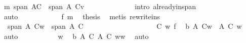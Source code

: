 \begin{isabellebody}
\ m{}{\isacharcolon}\ {\isachardoublequoteopen}span\ {\isacharparenleft}{\isacharquery}A{\isacharprime}{\isasymunion}C{\isacharprime}{\isacharparenright}\ {\isacharequal}\ span\ {\isacharparenleft}{\isacharparenleft}{\isacharquery}A{\isacharprime}{\isasymunion}\ C{\isacharprime}{\isacharparenright}{\isasymunion}{\isacharbraceleft}v{\isacharbraceright}{\isacharparenright}{\isachardoublequoteclose}\isanewline
\ \ \ \ \ \ \ \ \ \ \ \ \isamarkupfalse%
\ {\isacharparenleft}intro\ already{\isacharunderscore}in{\isacharunderscore}span{\isacharparenright}\ \isanewline
\ \ \ \ \ \ \ \ \ \ \ \ \ \isamarkupfalse%
\ auto\isanewline
\ \ \ \ \ \ \ \ \ \ \isamarkupfalse%
\ f\ m{}\ \isamarkupfalse%
\ {\isacharquery}thesis\ \isamarkupfalse%
\ {\isacharparenleft}metis\ rewrite{\isacharunderscore}ins{\isacharparenright}\isanewline
\ \ \ \ \ \ \ \ \isamarkupfalse%
\isanewline
\ \ \ \ \ \ \isamarkupfalse%
\ {}{\isacharcolon}\ {\isachardoublequoteopen}span\ {\isacharparenleft}A{\isasymunion}\ {\isacharparenleft}C{\isacharprime}{\isacharminus}{\isacharbraceleft}w{\isacharbraceright}{\isacharparenright}{\isacharparenright}\ {\isacharequal}\ span\ {\isacharparenleft}A{\isasymunion}\ C{\isacharprime}{\isacharparenright}{\isachardoublequoteclose}\ \isanewline
\ \ \ \ \ \ \isamarkupfalse%
\ {\isacharminus}\ \isanewline
\ \ \ \ \ \ \ \ \isamarkupfalse%
\ C{\isacharprime}\ w{\isacharparenleft}{}{\isacharparenright}\ f\ \isamarkupfalse%
\ b{}{}{\isacharcolon}\ {\isachardoublequoteopen}A{\isasymunion}\ {\isacharparenleft}C{\isacharprime}{\isacharminus}{\isacharbraceleft}w{\isacharbraceright}{\isacharparenright}\ {\isacharequal}\ {\isacharparenleft}A{\isasymunion}\ C{\isacharprime}{\isacharparenright}\ {\isacharminus}{\isacharbraceleft}w{\isacharbraceright}{\isachardoublequoteclose}\ \isamarkupfalse%
\ auto\isanewline
\ \ \ \ \ \ \ \ \isamarkupfalse%
\ \ w{\isacharparenleft}{}{\isacharparenright}\ \isamarkupfalse%
\ b{}{}{\isacharcolon}\ {\isachardoublequoteopen}A{\isasymunion}\ C{\isacharprime}{\isacharequal}\ {\isacharparenleft}A{\isasymunion}\ C{\isacharprime}\ {\isacharminus}{\isacharbraceleft}w{\isacharbraceright}{\isacharparenright}{\isasymunion}{\isacharbraceleft}w{\isacharbraceright}{\isachardoublequoteclose}\ \isamarkupfalse%
\ auto\isanewline
\ \ \ \ \ \ \ \ \isamarkupfalse%

\end{isabellebody}

